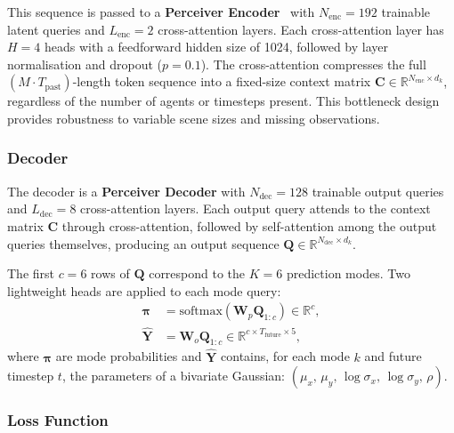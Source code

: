 \documentclass[12pt, a4paper]{article}
\begin{document}
This sequence is passed to a \textbf{Perceiver Encoder}~\citep{nayakanti2022wayformer}
with $N_{\text{enc}} = 192$ trainable latent queries and
$L_{\text{enc}} = 2$ cross-attention layers. Each cross-attention
layer has $H = 4$ heads with a feedforward hidden size of 1024,
followed by layer normalisation and dropout ($p = 0.1$). The cross-attention
compresses the full $(M \cdot T_{\text{past}})$-length token sequence
into a fixed-size context matrix
$\mathbf{C} \in \mathbb{R}^{N_{\text{enc}} \times d_k}$, regardless
of the number of agents or timesteps present. This bottleneck design
provides robustness to variable scene sizes and missing observations.

\subsubsection{Decoder}
\label{sec:decoder}

The decoder is a \textbf{Perceiver Decoder} with
$N_{\text{dec}} = 128$ trainable output queries and $L_{\text{dec}} = 8$
cross-attention layers. Each output query attends to the context matrix
$\mathbf{C}$ through cross-attention, followed by self-attention among
the output queries themselves, producing an output sequence
$\mathbf{Q} \in \mathbb{R}^{N_{\text{dec}} \times d_k}$.

The first $c = 6$ rows of $\mathbf{Q}$ correspond to the $K = 6$
prediction modes. Two lightweight heads are applied to each mode query:
\begin{align}
    \boldsymbol{\pi} &= \text{softmax}\!\left(\mathbf{W}_p \mathbf{Q}_{1:c}\right)
    \in \mathbb{R}^{c}, \label{eq:mode_prob} \\
    \hat{\mathbf{Y}} &= \mathbf{W}_o \mathbf{Q}_{1:c} \in \mathbb{R}^{c \times T_{\text{future}} \times 5},
    \label{eq:traj_out}
\end{align}
where $\boldsymbol{\pi}$ are mode probabilities and $\hat{\mathbf{Y}}$
contains, for each mode $k$ and future timestep $t$, the parameters of
a bivariate Gaussian: $(\mu_x,\, \mu_y,\, \log\sigma_x,\, \log\sigma_y,\, \rho)$.

\subsubsection{Loss Function}
\label{sec:loss}
\end{document}
